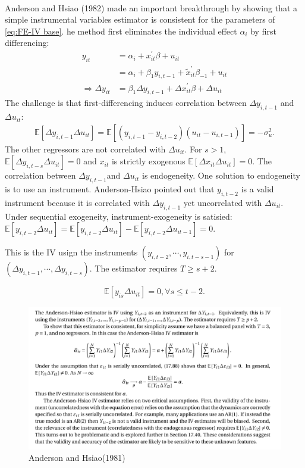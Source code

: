 \begin{definition}
    \

    Anderson and Hsiao (1982) made an important breakthrough by showing that 
    a simple instrumental variables estimator is consistent for the parameters of \ref{eq:FE-IV base}.
    he method first eliminates the individual effect $\alpha_i$ by first differencing:
    \begin{align*}
        y_{it} &= \alpha_i + x_{it}^{\prime} \beta + u_{it} \\
        &= \alpha_i + \beta_1 y_{i, t-1} + \tilde{x}_{it}^{\prime} \beta_{-1} + u_{it}  \\
        \Rightarrow \Delta y_{it} &= \beta_1 \Delta y_{i,t-1} + \Delta x_{it}^{\prime} \beta + \Delta u_{it}
    \end{align*}
    The challenge is that first-differencing induces correlation between $\Delta y_{i,t-1}$ and $\Delta u_{it}$:
    \begin{gather*}
        \mathbb{E}[\Delta y_{i,t-1} \Delta u_{it}] = \mathbb{E}\left[ (y_{i,t-1} - y_{i,t-2})(u_{it} - u_{i,t-1})\right] = -\sigma_u^2.
    \end{gather*}
    The other regressors are not correlated with $\Delta u_{it}$.
    For $s>1$, $\mathbb{E}[\Delta y_{i,t-s} \Delta u_{it}] = 0$ and $x_{it}$ is strictly exogenous $\mathbb{E}[\Delta x_{it} \Delta u_{it}] = 0.$
    The correlation between $\Delta y_{i,t-1}$and $\Delta u_{it}$ is endogeneity. 
    One solution to endogeneity is to use an instrument. 
    Anderson-Hsiao pointed out that $y_{i,t-2}$ is a valid instrument because it is correlated with $\Delta y_{i,t-1}$ yet uncorrelated with $\Delta u_{it}$.
    Under sequential exogeneity, instrument-exogeneity is satisied:
    $\mathbb{E}[y_{i,t-2} \Delta u_{it}] = \mathbb{E}[y_{i,t-2} \Delta u_{it}] - \mathbb{E}[y_{i,t-2} \Delta u_{it-1}] = 0.$

    This is the IV usign the instruments $(y_{i,t-2}, \cdots, y_{i,t-s-1})$ for $(\Delta y_{i,t-1}, \cdots, \Delta y_{i,t-s})$.
    The estimator requires $T \geq s+2.$
    
    \[\mathbb{E}[y_{is} \Delta u_{it}] = 0, \forall s\leq t-2.\]
\end{definition}

\begin{figure}[htbp!]
    \centering
    \includegraphics[width=\linewidth]{figures/Anderson-Hsiao-1981-2.png}
    \caption{Anderson and Hsiao(1981)}
\end{figure}

